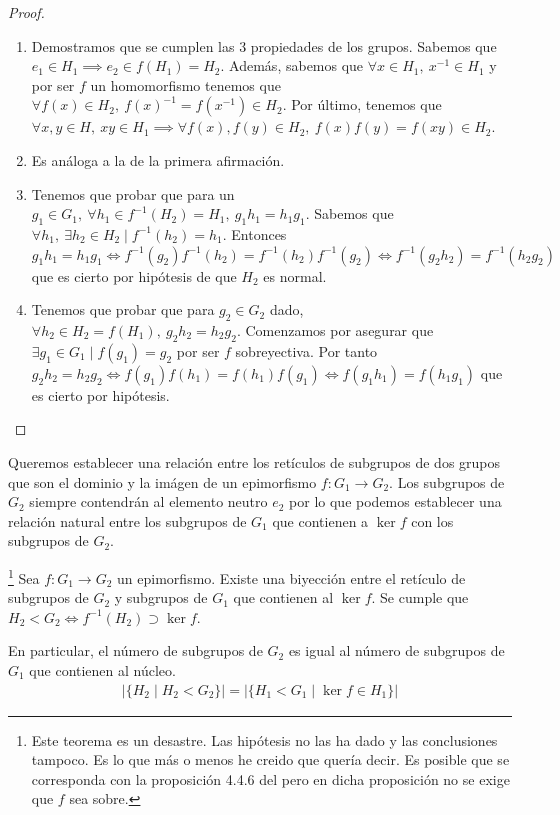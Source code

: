 \documentclass{book}
\theoremstyle{definition}
\theoremstyle{remark}
\newcommand{\inv}[1]{#1^{-1}}
\begin{document}
\begin{proof}$ $\newline
	\begin{enumerate}
		\item Demostramos que se cumplen las 3 propiedades de los grupos. Sabemos que $e_1 \in H_1 \implies e_2 \in f(H_1) = H_2$. Además, sabemos que $\forall x \in H_1,\ \inv{x} \in H_1$ y por ser $f$ un homomorfismo tenemos que $\forall f(x) \in H_2,\ \inv{f(x)} = f(\inv{x}) \in H_2$. Por último, tenemos que $\forall x,y \in H,\ xy \in H_1 \implies \forall f(x),f(y) \in H_2,\ f(x)f(y) = f(xy) \in H_2$.
		\item Es análoga a la de la primera afirmación.
		\item Tenemos que probar que para un $g_1 \in G_1,\ \forall h_1 \in f^{-1}(H_2) = H_1,\ g_1 h_1 = h_1 g_1$. Sabemos que $\forall h_1,\ \exists h_2 \in H_2 \mid \inv{f}(h_2) = h_1$. Entonces $g_1h_1 = h_1 g_1 \iff \inv{f}(g_2)\inv{f}(h_2) = \inv{f}(h_2)\inv{f}(g_2) \iff \inv{f}(g_2h_2) = \inv{f}(h_2g_2)$ que es cierto por hipótesis de que $H_2$ es normal.
		\item Tenemos que probar que para $g_2 \in G_2$ dado, $\forall h_2 \in H_2 = f(H_1),\ g_2h_2 = h_2g_2$. Comenzamos por asegurar que $\exists g_1 \in G_1 \mid f(g_1) = g_2$ por ser $f$ sobreyectiva. Por tanto $g_2h_2 = h_2 g_2 \iff f(g_1)f(h_1) = f(h_1)f(g_1) \iff f(g_1h_1) = f(h_1g_1)$ que es cierto por hipótesis.
	\end{enumerate}
\end{proof}

Queremos establecer una relación entre los retículos de subgrupos de dos grupos que son el dominio y la imágen de un epimorfismo $f: G_1 \to G_2$. Los subgrupos de $G_2$ siempre contendrán al elemento neutro $e_2$ por lo que podemos establecer una relación natural entre los subgrupos de $G_1$ que contienen a $\ker f$ con los subgrupos de $G_2$.

\begin{thm}\footnote{Este teorema es un desastre. Las hipótesis no las ha dado y las conclusiones tampoco. Es lo que más o menos he creido que quería decir. Es posible que se corresponda con la proposición 4.4.6 del \cite{dor96} pero en dicha proposición no se exige que $f$ sea sobre.}
	Sea $f: G_1 \to G_2$ un epimorfismo. Existe una biyección entre el retículo de subgrupos de $G_2$ y subgrupos de $G_1$ que contienen al $\ker f$. Se cumple que $H_2 < G_2 \iff \inv{f}(H_2) \supset \ker f$.
	
	En particular, el número de subgrupos de $G_2$ es igual al número de subgrupos de $G_1$ que contienen al núcleo.
	\begin{align*}
		|\{H_2 \mid H_2 < G_2\}| = |\{H_1 < G_1 \mid \ker f \in H_1\}|
	\end{align*}
\end{thm}
\end{document}
